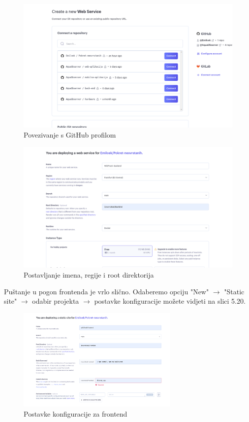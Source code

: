 			\begin{figure}[H]
				\centering
				\includegraphics[width=\textwidth]{slike/slika4.PNG}
				\caption{Povezivanje s GitHub profilom }
				\label{fig:dijagram_baze}
			\end{figure}
			
			\begin{figure}[H]
				\centering
				\includegraphics[width=\textwidth]{slike/slika5.PNG}
				\caption{Postavljanje imena, regije i root direktorija}
				\label{fig:dijagram_baze}
			\end{figure}
		
			Puštanje u pogon frontenda je vrlo slično. Odaberemo opciju "New" $\rightarrow$ "Static site" $\rightarrow$ odabir projekta $\rightarrow$ postavke konfiguracije možete vidjeti na slici 5.20.
			
			\begin{figure}[H]
				\centering
				\includegraphics[width=0.7\textwidth]{slike/slika6.PNG}
				\caption{Postavke konfiguracije za frontend}
				\label{fig:dijagram_baze}
			\end{figure}
			
